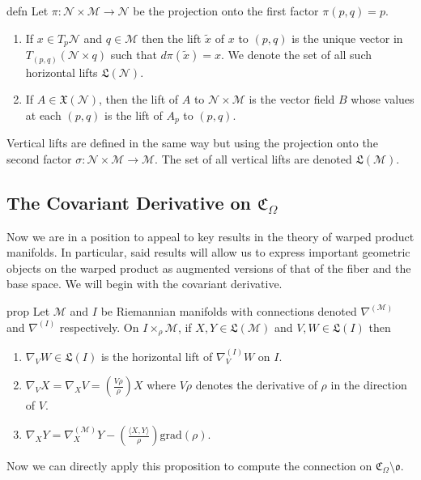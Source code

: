 \documentclass[11pt]{article}
\newcommand{\man}{\mathcal{M}}
\begin{document}
\begin{restatable}{defn}{}
    Let $\pi: \mathcal{N} \times \man\rightarrow \mathcal{N}$ be the projection onto the first factor $\pi(p, q) = p$. 
    \begin{enumerate}
        \item If $x \in T_p\mathcal{N}$ and $q \in \mathcal{M}$ then the lift $\tilde{x}$ of $x$ to $(p,q)$ is the unique vector in $T_{(p,q)}(\mathcal{N} \times q)$ such that $d\pi(\tilde{x}) = x$. We denote the set of all such horizontal lifts $\mathfrak{L}(\mathcal{N}).$
        \item If $A \in \mathfrak{X}(\mathcal{N})$, then the lift of $A$ to $\mathcal{N} \times \man$ is the vector field $B$ whose values at each $(p,q)$ is the lift of $A_p$ to $(p,q).$
    \end{enumerate}
    Vertical lifts are defined in the same way but using the projection onto the second factor $\sigma: \mathcal{N} \times \man \rightarrow \man$. The set of all vertical lifts are denoted $\mathfrak{L}(\man).$ 
\end{restatable}

\subsection{The Covariant Derivative on $\mathfrak{C}_\Omega$}

Now we are in a position to appeal to key results in the theory of warped product manifolds. In particular, said results will allow us to express important geometric objects on the warped product as augmented versions of that of the fiber and the base space. We will begin with the covariant derivative.

\begin{restatable}{prop}{}
    Let $\man$ and $I$ be Riemannian manifolds with connections denoted $\nabla^{(\man)}$ and $\nabla^{(I)}$ respectively. On $I \times_\rho \man$, if $X, Y \in \mathfrak{L}(\man)$ and $V, W \in \mathfrak{L}(I)$ then
    \begin{enumerate}
        \item $\nabla_VW \in \mathfrak{L}(I)$ is the horizontal lift of $\nabla^{(I)}_VW$ on $I$.
        \item $\nabla_VX = \nabla_XV = \left(\frac{V\rho}{\rho}\right)X$ where $V\rho$ denotes the derivative of $\rho$ in the direction of $V$.
        \item $\nabla_XY = \nabla_X^{(\man)}Y - \left(\frac{\langle X, Y\rangle}{\rho}\right)\text{grad}(\rho)$.
    \end{enumerate}
\end{restatable}
\noindent Now we can directly apply this proposition to compute the connection on $\mathfrak{C}_\Omega \setminus \mathfrak{o}.$ 
\end{document}
